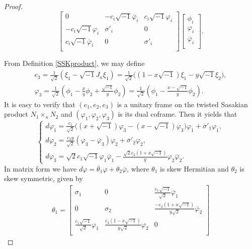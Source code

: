 \documentclass{amsart}
\numberwithin{equation}{section}
\theoremstyle{definition}
\renewcommand{\1}{\mathds{1}}
\renewcommand{\>}{\rightarrow}
\begin{document}
\begin{proof}
\[\begin{bmatrix} 0 & - c_i \sqrt{-1} \overline{\varphi}_i & c_i \sqrt{-1} \varphi_i \\
-c_i \sqrt{-1} \varphi_i & \overline{\sigma}'_i & 0 \\
c_i \sqrt{-1} \overline{\varphi}_i & 0 & \sigma'_i  \\ \end{bmatrix}\!\!
\begin{bmatrix} \phi_i \\ \varphi_i \\ \overline{\varphi}_i \\ \end{bmatrix}\!\!.\]

From Definition \ref{SSKproduct}, we may define
\begin{gather*}
e_3 = \frac{1}{\sqrt{2}}(\xi_1 - \sqrt{-1}J_{\kappa}\xi_1 ) = \frac{1}{\sqrt{2}}\big((1-x\sqrt{-1})\xi_1 - y\sqrt{-1} \xi_2 \big),\\
\varphi_3 = \frac{1}{\sqrt{2}}(\phi_1 - \frac{x}{y} \phi_2 + \frac{\sqrt{-1}}{y} \phi_2 ) =  \frac{1}{\sqrt{2}}(\phi_1 - \frac{x-\sqrt{-1}}{y} \phi_2 ).
\end{gather*}
It is easy to verify that $(e_1,e_2,e_3)$ is a unitary frame on the twisted Sasakian product $N_1 \times_{\kappa} N_2$ and  $(\varphi_1,\varphi_2,\varphi_3)$ is its dual coframe. Then it yields that
\[ \begin{cases}
d \varphi_1 = \frac{c_1}{\sqrt{2}}\big( (x + \sqrt{-1}) \varphi_3 - (x-\sqrt{-1}) \overline{\varphi}_3 \big)\varphi_1
+ \overline{\sigma}'_1 \varphi_1, \\
d \varphi_2 = \frac{c_2y}{\sqrt{2}}(\varphi_3 - \overline{\varphi}_3) \varphi_2 + \overline{\sigma}'_2 \varphi_2, \\
d \varphi_3 = \sqrt{2} c_1 \sqrt{-1} \varphi_1 \overline{\varphi}_1 - \frac{\sqrt{2}c_2 (1+x\sqrt{-1})}{y} \varphi_2 \overline{\varphi}_2.
\end{cases} \]
In matrix form we have $d \varphi = \overline{\theta}_1 \varphi + \theta_2 \overline{\varphi}$, where $\theta_1$ is skew Hermitian and $\theta_2$ is skew symmetric, given by
\begin{gather*}
\theta_1= \begin{bmatrix} \sigma_1 & 0 & \frac{c_1\sqrt{-1}}{\sqrt{2}} \overline{\varphi}_1  \\
                            0 & \sigma_2 & \frac{-c_2(1+x\sqrt{-1})}{y\sqrt{2}} \overline{\varphi}_2 \\
                            \frac{c_1\sqrt{-1}}{\sqrt{2}} \varphi_1 & \frac{c_2(1-x\sqrt{-1})}{y\sqrt{2}} \varphi_2 & 0 \\

\end{bmatrix}
\end{gather*}
\end{proof}
\end{document}
